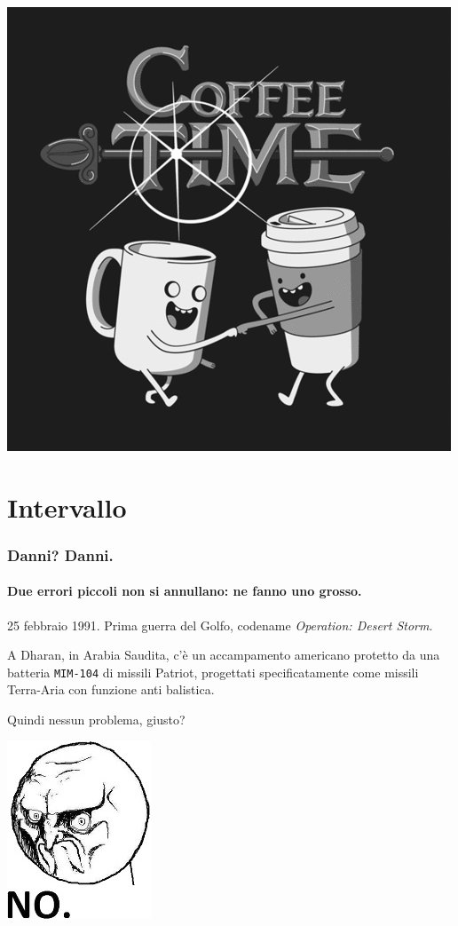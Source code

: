 \documentclass{beamer}
\begin{document}
  \begin{frame}
  		\begin{center}
		  \includegraphics[width=.6\textwidth]{IMGs/CoffeeTime.png}
		\end{center}
  \end{frame}
  \section{Intervallo}
	  \begin{frame}
	    \frametitle{Danni? Danni.}
	    \framesubtitle{Due errori piccoli non si annullano: ne fanno uno grosso.}
	    25 febbraio 1991. Prima guerra del Golfo, codename \emph{Operation: Desert Storm}.
	    
			\vspace{2em}	    
	    
	    A Dharan, in Arabia Saudita, c'è un accampamento americano protetto da una batteria \texttt{MIM-104} di
	    missili Patriot, progettati specificatamente come missili Terra-Aria con funzione
	    anti balistica.
	    
	    Quindi nessun problema, giusto?
	    
	    \pause
	    
	    \begin{center}
		    		\includegraphics[width=.2\textwidth]{IMGs/no.jpg}
		    \end{center}
	    
	  \end{frame}
	  
\end{document}
